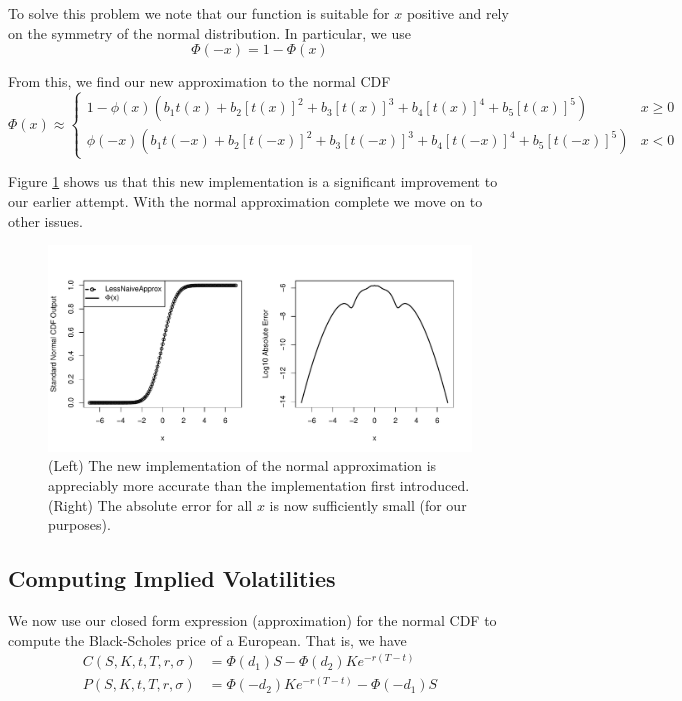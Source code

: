 \documentclass[11pt]{article}
\newlength\tindent
\renewcommand{\indent}{\hspace*{\tindent}}
\begin{document}
\indent To solve this problem we note that our function is suitable for $x$ positive and rely on the symmetry of the normal distribution. In particular, we use
\begin{equation*}
	\Phi(-x) = 1 - \Phi(x)
\end{equation*}

From this, we find our new approximation to the normal CDF
\begin{equation*}
	\Phi(x) \approx
	\begin{cases}
		1 - \phi(x)(b_1 t(x) + b_2 [t(x)]^2 + b_3 [t(x)]^3 + b_4 [t(x)]^4 + b_5 [t(x)]^5) & x \geq 0 \\
		\phi(-x)(b_1 t(-x) + b_2 [t(-x)]^2 + b_3 [t(-x)]^3 + b_4 [t(-x)]^4 + b_5 [t(-x)]^5) & x < 0
	\end{cases}
\end{equation*}

\indent Figure \ref{fig:lessnaive_approx_error} shows us that this new implementation is a significant improvement to our earlier attempt. With the normal approximation complete we move on to other issues.

\begin{figure}[H]
	\centering
 	\includegraphics[scale=0.55]{../plots/q1/lessnaive_approx_error.pdf}
\caption{(Left) The new implementation of the normal approximation is appreciably more accurate than the implementation first introduced. (Right) The absolute error for all $x$ is now sufficiently small (for our purposes).}
\label{fig:lessnaive_approx_error}
\end{figure}

\subsection{Computing Implied Volatilities}

\indent We now use our closed form expression (approximation) for the normal CDF to compute the Black-Scholes price of a European. That is, we have
\begin{align*}
	C(S,K, t, T, r, \sigma) &= \Phi(d_1)S - \Phi(d_2)Ke^{-r(T - t)} \\
	P(S,K, t, T, r, \sigma) &= \Phi(-d_2)Ke^{-r(T - t)} - \Phi(-d_1)S
\end{align*}
\end{document}
